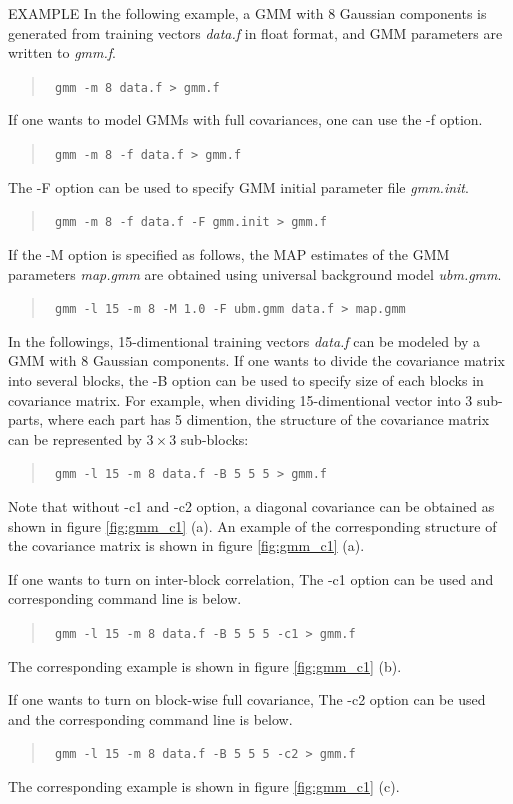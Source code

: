 \begin{qsection}{EXAMPLE}
In the following example, a GMM with 8 Gaussian components is generated
from training vectors {\em data.f} in float format, and GMM parameters
are written to {\em gmm.f}.
\begin{quote}
\verb! gmm -m 8 data.f > gmm.f!
\end{quote}
If one wants to model GMMs with full covariances,
 one can use the -f option.
\begin{quote}
\verb! gmm -m 8 -f data.f > gmm.f! 
\end{quote}
The -F option can be used to specify GMM
initial parameter file {\em gmm.init}.
\begin{quote}
\verb! gmm -m 8 -f data.f -F gmm.init > gmm.f! 
\end{quote}

If the -M option is specified as follows, the MAP estimates of the GMM parameters {\em map.gmm} are obtained using universal background model {\em ubm.gmm}.
\begin{quote}
 \verb! gmm -l 15 -m 8 -M 1.0 -F ubm.gmm data.f > map.gmm !
\end{quote}

In the followings, 15-dimentional training vectors {\em data.f} can be modeled
by a GMM with 8 Gaussian components.  If one wants to divide the covariance
matrix into several blocks, the -B option can be used to specify size of each
blocks in covariance matrix.  For example, when dividing 15-dimentional vector
into 3 sub-parts, where each part has 5 dimention, the structure of the
covariance matrix can be represented by $3 \times 3$ sub-blocks:
 \begin{quote}
  \verb! gmm -l 15 -m 8 data.f -B 5 5 5 > gmm.f!
 \end{quote}
 Note that without -c1 and -c2 option, a diagonal covariance can be obtained
 as shown in figure \ref{fig:gmm_c1} (a).
 An example of the corresponding structure of
 the covariance matrix is shown in figure \ref{fig:gmm_c1} (a).

 If one wants to turn on inter-block correlation,
 The -c1 option can be used and corresponding command line is below.
 \begin{quote}
  \verb! gmm -l 15 -m 8 data.f -B 5 5 5 -c1 > gmm.f!
 \end{quote}
 The corresponding example is shown in figure \ref{fig:gmm_c1} (b).

 If one wants to turn on block-wise full covariance,
 The -c2 option can be used and the corresponding command line is below.
 \begin{quote}
  \verb! gmm -l 15 -m 8 data.f -B 5 5 5 -c2 > gmm.f!
 \end{quote}
 The corresponding example is shown in figure \ref{fig:gmm_c1} (c).


\end{qsection}
